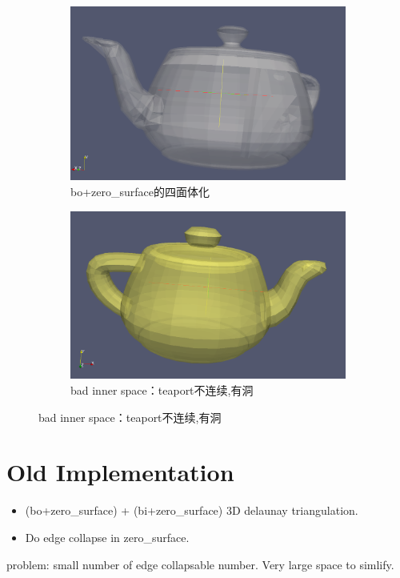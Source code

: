 \documentclass{article}
\theoremstyle{definition}
\theoremstyle{remark}
\begin{document}
  \begin{figure}[h]
    \begin{subfigure}[b]{0.4\textwidth}
      \includegraphics[width=\textwidth]{bad_inner_space0.png}
      \caption[现象]{bo+zero\_surface的四面体化}
    \end{subfigure}
    \begin{subfigure}[b]{0.4\textwidth}
      \includegraphics[width=\textwidth]{bad_inner_space1.png}
      \caption[原因]{bad inner space：teaport不连续,有洞}
    \end{subfigure}
  \end{figure}

  \section{Old Implementation}
  \begin{itemize}
  \item (bo+zero\_surface) + (bi+zero\_surface) 3D delaunay triangulation.
  \item Do edge collapse in zero\_surface.
  \end{itemize}
  problem: small number of edge collapsable number. Very large space to simlify.
\end{document}
